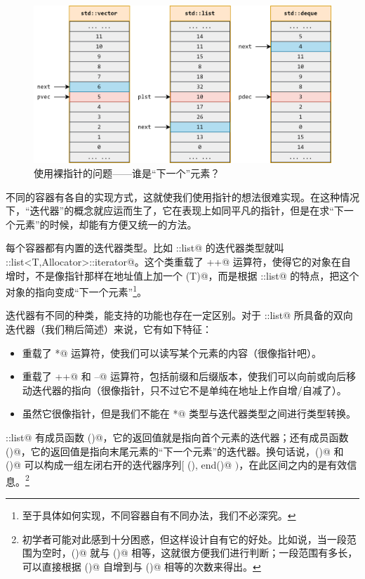 \begin{figure}[htbp]
    \centering
    \includegraphics[width=\textwidth]{../images/generalized_parts/11_different_types_of_pointer_to_containers.png}
    \caption{使用裸指针的问题——谁是``下一个''元素？}
\end{figure}
不同的容器有各自的实现方式，这就使我们使用指针的想法很难实现。在这种情况下，``迭代器''的概念就应运而生了，它在表现上如同平凡的指针，但是在求``下一个元素''的时候，却能有方便又统一的方法。\par
每个容器都有内置的迭代器类型。比如 \lstinline@std::list@ 的迭代器类型就叫 \lstinline@std::list<T,Allocator>::iterator@。这个类重载了 \lstinline@++@ 运算符，使得它的对象在自增时，不是像指针那样在地址值上加一个 \lstinline@sizeof(T)@，而是根据 \lstinline@std::list@ 的特点，把这个对象的指向变成``下一个元素''\footnote{至于具体如何实现，不同容器自有不同办法，我们不必深究。}。\par
迭代器有不同的种类，能支持的功能也存在一定区别。对于 \lstinline@std::list@ 所具备的双向迭代器（我们稍后简述）来说，它有如下特征：
\begin{itemize}
    \item 重载了 \lstinline@*@ 运算符，使我们可以读写某个元素的内容（很像指针吧）。
    \item 重载了 \lstinline@++@ 和 \lstinline@--@ 运算符，包括前缀和后缀版本，使我们可以向前或向后移动迭代器的指向（很像指针，只不过它不是单纯在地址上作自增/自减了）。
    \item 虽然它很像指针，但是我们不能在 \lstinline@T*@ 类型与迭代器类型之间进行类型转换。
\end{itemize}\par
\lstinline@std::list@ 有成员函数 \lstinline@begin()@，它的返回值就是指向首个元素的迭代器；还有成员函数 \lstinline@end()@，它的返回值是指向末尾元素的``下一个元素''的迭代器。换句话说，\lstinline@begin()@ 和 \lstinline@end()@ 可以构成一组左闭右开的迭代器序列$[$ \lstinline@begin(), end()@ $)$，在此区间之内的是有效信息。\footnote{初学者可能对此感到十分困惑，但这样设计自有它的好处。比如说，当一段范围为空时，\lstinline@begin()@ 就与 \lstinline@end()@ 相等，这就很方便我们进行判断；一段范围有多长，可以直接根据 \lstinline@begin()@ 自增到与 \lstinline@end()@ 相等的次数来得出。}\par
